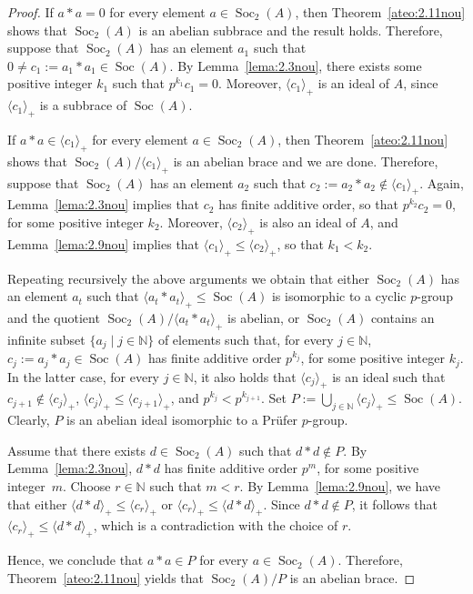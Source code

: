\documentclass[12pt, a4paper, english]{article}
\theoremstyle{definition}
\DeclareMathOperator{\Soc}{Soc}
\begin{document}
\begin{proof}
If $a \ast a = 0$ for every element $a \in \Soc_2(A)$, then Theorem~\ref{ateo:2.11nou} shows that $\Soc_2(A)$ is an abelian subbrace and the result holds. Therefore, suppose that $\Soc_2(A)$ has an element $a_1$ such that $0 \neq c_1:= a_1 \ast a_1 \in \Soc(A)$. By Lemma~\ref{lema:2.3nou}, there exists some positive integer $k_1$ such that $p^{k_1}c_1 = 0$. Moreover, $\langle c_1\rangle_+$ is an ideal of $A$, since $\langle c_1\rangle_+$ is a subbrace of $\Soc(A)$.

If $a \ast a \in \langle c_1\rangle_+$ for every element $a \in \Soc_2(A)$, then Theorem~\ref{ateo:2.11nou} shows that $\Soc_2(A)/\langle c_1\rangle_+$ is an abelian brace and we are done. Therefore, suppose that $\Soc_2(A)$ has an element $a_2$ such that $c_2:= a_2 \ast a_2  \notin \langle c_1 \rangle_+$. Again,  Lemma~\ref{lema:2.3nou} implies that $c_2$ has finite additive order, so that $p^{k_2}c_2 = 0$, for some positive integer $k_2$. Moreover, $\langle c_2\rangle_+$ is also an ideal of $A$, and  Lemma~\ref{lema:2.9nou} implies that $\langle c_1\rangle_+ \leq \langle c_2\rangle_+$, so that $k_1 < k_2$. 

Repeating recursively the above arguments we obtain that either $\Soc_2(A)$ has an element $a_t$ such that $\langle a_t \ast a_t\rangle_+ \leq \Soc(A)$ is isomorphic to a cyclic $p$-group and the quotient $\Soc_2(A)/ \langle a_t \ast a_t\rangle_+$ is abelian, or $\Soc_2(A)$ contains an infinite subset $\{a_j\mid j\in \mathbb{N}\}$ of elements such that, for every $j\in \mathbb{N}$, $c_j:= a_j\ast a_j \in \Soc(A)$ has finite additive order $p^{k_j}$, for some positive integer $k_j$. In the latter case, for every $j \in \mathbb{N}$, it also holds that $\langle c_j \rangle_+$ is an ideal such that $c_{j+1}\notin \langle c_j\rangle_+$, $\langle c_j \rangle_+ \leq \langle c_{j+1}\rangle_+$, and $p^{k_j} < p^{k_{j+1}}$. Set $P := \bigcup_{j\in \mathbb{N}} \langle c_j\rangle_+ \leq \Soc(A)$. Clearly, $P$ is an abelian ideal isomorphic to a Prüfer $p$-group.

Assume that there exists $d \in \Soc_2(A)$ such that $d \ast d \notin P$. By Lemma~\ref{lema:2.3nou}, $d\ast d$ has finite additive order $p^m$, for some positive integer~$m$. Choose $r \in \mathbb{N}$ such that $m < r$. By Lemma~\ref{lema:2.9nou}, we have that either $\langle d\ast d \rangle_+ \leq \langle c_r \rangle_+$ or $\langle c_r \rangle_+ \leq \langle d \ast d \rangle_+$. Since $d \ast d \notin P$, it follows that $\langle c_r \rangle_+ \leq \langle d \ast d \rangle_+$, which is a contradiction with the choice of $r$.  

Hence, we conclude that $a \ast a \in P$ for every $a \in \Soc_2(A)$. Therefore, Theorem~\ref{ateo:2.11nou} yields that $\Soc_2(A)/P$ is an abelian brace.
\end{proof}
\end{document}
